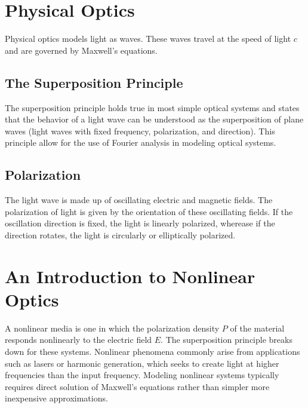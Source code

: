 \documentclass[book.tex]{subfiles}
\begin{document}
\section{Physical Optics}

Physical optics models light as waves. These waves travel at the speed of light $c$ and are governed by Maxwell's equations.

\subsection{The Superposition Principle}

The superposition principle holds true in most simple optical systems and states that the behavior of a light wave can be understood as the superposition of plane waves (light waves with fixed frequency, polarization, and direction). This principle allow for the use of Fourier analysis in modeling optical systems.

\subsection{Polarization}

The light wave is made up of oscillating electric and magnetic fields. The polarization of light is given by the orientation of these oscillating fields. If the oscillation direction is fixed, the light is linearly polarized, wherease if the direction rotates, the light is circularly or elliptically polarized.


\section{An Introduction to Nonlinear Optics}

A nonlinear media is one in which the polarization density $P$ of the material responds nonlinearly to the electric field $E$. The superposition principle breaks down for these systems. Nonlinear phenomena commonly arise from applications such as lasers or harmonic generation, which seeks to create light at higher frequencies than the input frequency. Modeling nonlinear systems typically requires direct solution of Maxwell's equations rather than simpler more inexpensive approximations.
\end{document}
